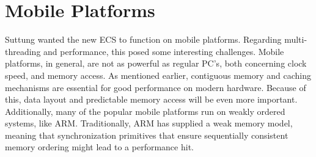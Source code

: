 \section{Mobile Platforms}
\label{sec:requirements_mobile_platforms}
Suttung wanted the new ECS to function on mobile platforms.
Regarding multi-threading and performance, this posed some interesting challenges.
Mobile platforms, in general, are not as powerful as regular PC's, both concerning clock speed, and memory access.
As mentioned earlier, contiguous memory and caching mechanisms are essential for good performance on modern hardware.
Because of this, data layout and predictable memory access will be even more important\cite[10:38]{andrei_alexandrescu_quick_code_quickly}.
Additionally, many of the popular mobile platforms run on weakly ordered systems, like ARM\cite{preshing_weak_vs_strong_memory_models}.
Traditionally, ARM has supplied a weak memory model, meaning that synchronization primitives that ensure sequentially consistent memory ordering might lead to a performance hit\cite{herb_sutter_atomic_weapons}.

